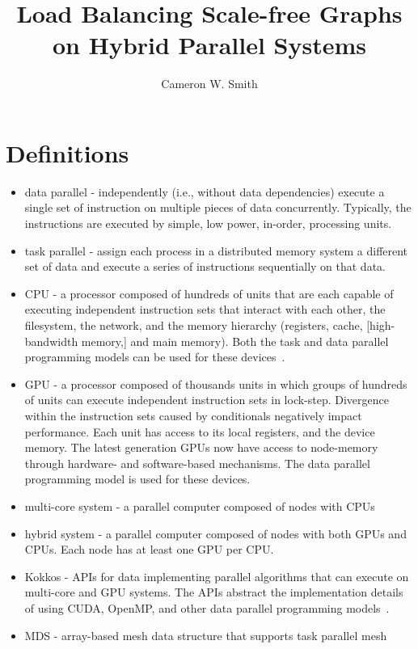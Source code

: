 \documentclass{article}
\title{Load Balancing Scale-free Graphs on Hybrid Parallel Systems}
\author{Cameron W. Smith}
\begin{document}
\maketitle
\section{Definitions}
\begin{itemize}
  \item data parallel - independently (i.e., without data dependencies) execute
    a single set of instruction on multiple pieces of data concurrently.
    Typically, the instructions are executed by simple, low power, in-order,
    processing units.
  \item task parallel - assign each process in a distributed memory system a
    different set of data and execute a series of instructions sequentially on
    that data.
  \item CPU - a processor composed of hundreds of units that are
    each capable of executing independent instruction sets that interact with
    each other, the filesystem, the network, and the memory hierarchy
    (registers, cache, [high-bandwidth memory,] and main memory).
    Both the task and data parallel programming models can be used for these
    devices~\cite{jeffers2016intel}.
  \item GPU - a processor composed of thousands units in which groups of
    hundreds of units can execute independent instruction sets in lock-step.
    Divergence within the instruction sets caused by conditionals negatively
    impact performance.
    Each unit has access to its local registers, and the device memory.
    The latest generation GPUs now have access to node-memory through hardware-
    and software-based mechanisms.
    The data parallel programming model is used for these devices.
  \item multi-core system - a parallel computer composed of nodes with CPUs
  \item hybrid system - a parallel computer composed of nodes with
    both GPUs and CPUs.
    Each node has at least one GPU per CPU.
  \item Kokkos - APIs for data implementing parallel algorithms that can execute on
    multi-core and GPU systems.  The APIs abstract the implementation details of
    using CUDA, OpenMP, and other data parallel programming
    models~\cite{edwards2013kokkos}.
  \item MDS - array-based mesh data structure that supports task parallel mesh

\end{itemize}
\end{document}
